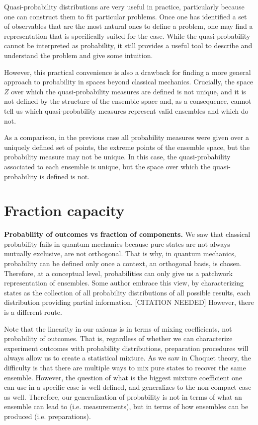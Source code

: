 \documentclass[10pt,twocolumn, nofootinbib]{revtex4-2}
\begin{document}
Quasi-probability distributions are very useful in practice, particularly because one can construct them to fit particular problems. Once one has identified a set of observables that are the most natural ones to define a problem, one may find a representation that is specifically suited for the case. While the quasi-probability cannot be interpreted as probability, it still provides a useful tool to describe and understand the problem and give some intuition.

However, this practical convenience is also a drawback for finding a more general approach to probability in spaces beyond classical mechanics. Crucially, the space $Z$ over which the quasi-probability measures are defined is not unique, and it is not defined by the structure of the ensemble space and, as a consequence, cannot tell us which quasi-probability measures represent valid ensembles and which do not.

As a comparison, in the previous case all probability measures were given over a uniquely defined set of points, the extreme points of the ensemble space, but the probability measure may not be unique. In this case, the quasi-probability associated to each ensemble is unique, but the space over which the quasi-probability is defined is not.

\section{Fraction capacity}

\textbf{Probability of outcomes vs fraction of components.} We saw that classical probability fails in quantum mechanics because pure states are not always mutually exclusive, are not orthogonal. That is why, in quantum mechanics, probability can be defined only once a context, an orthogonal basis, is chosen. Therefore, at a conceptual level, probabilities can only give us a patchwork representation of ensembles. Some author embrace this view, by characterizing states as the collection of all probability distributions of all possible results, each distribution providing partial information. [CITATION NEEDED] However, there is a different route.

Note that the linearity in our axioms is in terms of mixing coefficients, not probability of outcomes. That is, regardless of whether we can characterize experiment outcomes with probability distributions, preparation procedures will always allow us to create a statistical mixture. As we saw in Choquet theory, the difficulty is that there are multiple ways to mix pure states to recover the same ensemble. However, the question of what is the biggest mixture coefficient one can use in a specific case is well-defined, and generalizes to the non-compact case as well. Therefore, our generalization of probability is not in terms of what an ensemble can lead to (i.e. measurements), but in terms of how ensembles can be produced (i.e. preparations).
\end{document}
